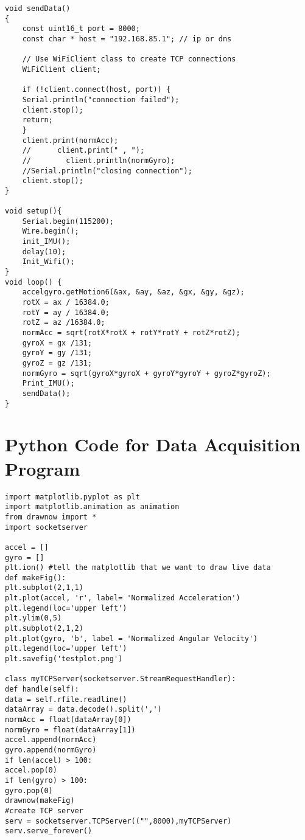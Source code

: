 \documentclass[letterpaper,12pt,titlepage,oneside,final]{book}
\begin{document}
\begin{verbatim}
void sendData()
{
	const uint16_t port = 8000;
	const char * host = "192.168.85.1"; // ip or dns
	
	// Use WiFiClient class to create TCP connections
	WiFiClient client;
	
	if (!client.connect(host, port)) {
	Serial.println("connection failed");
	client.stop();
	return;
	}
	client.print(normAcc);
	//	    client.print(" , ");
	//        client.println(normGyro);
	//Serial.println("closing connection");
	client.stop();
}

void setup(){
	Serial.begin(115200);
	Wire.begin();
	init_IMU();
	delay(10);
	Init_Wifi();
}
void loop() {
	accelgyro.getMotion6(&ax, &ay, &az, &gx, &gy, &gz);
	rotX = ax / 16384.0;
	rotY = ay / 16384.0;
	rotZ = az /16384.0;
	normAcc = sqrt(rotX*rotX + rotY*rotY + rotZ*rotZ);
	gyroX = gx /131;
	gyroY = gy /131;
	gyroZ = gz /131;
	normGyro = sqrt(gyroX*gyroX + gyroY*gyroY + gyroZ*gyroZ);
	Print_IMU();
	sendData();
}
\end{verbatim}%

\chapter{Python Code for Data Acquisition Program}
\begin{verbatim}
import matplotlib.pyplot as plt
import matplotlib.animation as animation
from drawnow import *
import socketserver

accel = []
gyro = []
plt.ion() #tell the matplotlib that we want to draw live data
def makeFig():
plt.subplot(2,1,1)
plt.plot(accel, 'r', label= 'Normalized Acceleration')
plt.legend(loc='upper left')
plt.ylim(0,5)
plt.subplot(2,1,2)
plt.plot(gyro, 'b', label = 'Normalized Angular Velocity')
plt.legend(loc='upper left')
plt.savefig('testplot.png')

class myTCPServer(socketserver.StreamRequestHandler):
def handle(self):
data = self.rfile.readline()
dataArray = data.decode().split(',')
normAcc = float(dataArray[0])
normGyro = float(dataArray[1])
accel.append(normAcc)
gyro.append(normGyro)
if len(accel) > 100:
accel.pop(0)
if len(gyro) > 100:
gyro.pop(0)
drawnow(makeFig)
#create TCP server
serv = socketserver.TCPServer(("",8000),myTCPServer)
serv.serve_forever()
\end{verbatim}%

\end{document}

